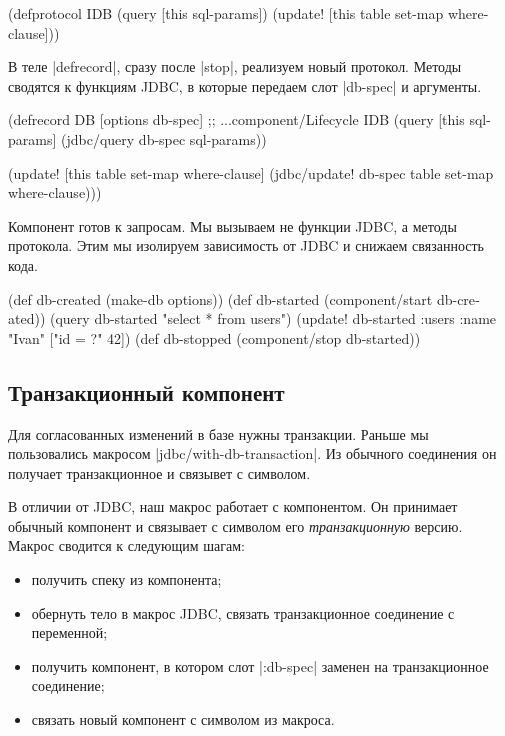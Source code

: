 \begin{english}
  \begin{clojure}
(defprotocol IDB
  (query [this sql-params])
  (update! [this table set-map where-clause]))
  \end{clojure}
\end{english}

В теле \spverb|defrecord|, сразу после \spverb|stop|, реализуем новый
протокол. Методы сводятся к функциям JDBC, в которые передаем слот
\spverb|db-spec| и аргументы.

\begin{english}
  \begin{clojure}
(defrecord DB [options db-spec]
  ;; ...component/Lifecycle
  IDB
  (query [this sql-params]
    (jdbc/query db-spec sql-params))

  (update! [this table set-map where-clause]
    (jdbc/update! db-spec table set-map where-clause)))
  \end{clojure}
\end{english}

Компонент готов к запросам. Мы вызываем не функции JDBC, а методы
протокола. Этим мы изолируем зависимость от JDBC и снижаем связанность кода.

\begin{english}
  \begin{clojure}
(def db-created (make-db options))
(def db-started (component/start db-created))
(query db-started "select * from users")
(update! db-started :users {:name "Ivan"} ["id = ?" 42])
(def db-stopped (component/stop db-started))
  \end{clojure}
\end{english}

\subsection{Транзакционный компонент}

Для согласованных изменений в базе нужны транзакции. Раньше мы пользовались
макросом \spverb|jdbc/with-db-transaction|. Из обычного соединения он получает
транзакционное и связывет с символом.

В отличии от JDBC, наш макрос работает с компонентом. Он принимает обычный
компонент и связывает с символом его \emph{транзакционную} версию. Макрос
сводится к следующим шагам:

\begin{itemize}

\item
  получить спеку из компонента;

\item
  обернуть тело в макрос JDBC, связать транзакционное соединение с переменной;

\item
  получить компонент, в котором слот \spverb|:db-spec| заменен на транзакционное
  соединение;

\item
  связать новый компонент с символом из макроса.

\end{itemize}

